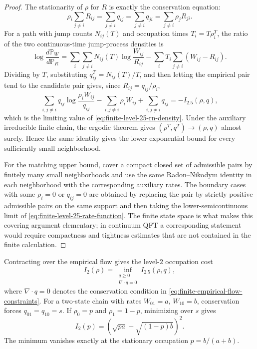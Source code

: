 \begin{proof}
The stationarity of \(\rho\) for \(R\) is exactly the conservation equation:
\[
  \rho_i\sum_{j\ne i}R_{ij}
  =
  \sum_{j\ne i}q_{ij}
  =
  \sum_{j\ne i}q_{ji}
  =
  \sum_{j\ne i}\rho_jR_{ji}.
\]
For a path with jump counts \(N_{ij}(T)\) and occupation times
\(T_i=T\rho_i^T\), the ratio of the two continuous-time jump-process
densities is
\[
  \log\frac{d\mathbb P_W}{d\mathbb P_R}
  =
  \sum_{i}\sum_{j\ne i}
  N_{ij}(T)\log\frac{W_{ij}}{R_{ij}}
  -
  \sum_i T_i
  \sum_{j\ne i}(W_{ij}-R_{ij}).
\]
Dividing by \(T\), substituting \(q^T_{ij}=N_{ij}(T)/T\), and then letting
the empirical pair tend to the candidate pair gives, since
\(R_{ij}=q_{ij}/\rho_i\),
\[
  \sum_{i,j\ne i}
  q_{ij}\log\frac{\rho_iW_{ij}}{q_{ij}}
  -
  \sum_{i,j\ne i}
  \rho_iW_{ij}
  +
  \sum_{i,j\ne i}q_{ij}
  =
  -I_{2.5}(\rho,q),
\]
which is the limiting value of \eqref{eq:finite-level-25-rn-density}.
Under the auxiliary irreducible finite chain, the ergodic theorem gives
\((\rho^T,q^T)\to(\rho,q)\) almost surely.  Hence the same identity gives
the lower exponential bound for every sufficiently small neighborhood.

For the matching upper bound, cover a compact closed set of admissible
pairs by finitely many small neighborhoods and use the same
Radon--Nikodym identity in each neighborhood with the corresponding
auxiliary rates.  The boundary cases with some \(\rho_i=0\) or \(q_{ij}=0\)
are obtained by replacing the pair by strictly positive admissible pairs on
the same support and then taking the lower-semicontinuous limit of
\eqref{eq:finite-level-25-rate-function}.  The finite state space is what
makes this covering argument elementary; in continuum QFT a corresponding
statement would require compactness and tightness estimates that are not
contained in the finite calculation.
\end{proof}

Contracting over the empirical flow gives the level-\(2\) occupation cost
\begin{equation}
  I_2(\rho)
  =
  \inf_{\substack{q\ge0\\ \nabla\cdot q=0}}
  I_{2.5}(\rho,q),
  \label{eq:finite-level-2-contraction}
\end{equation}
where \(\nabla\cdot q=0\) denotes the conservation condition in
\eqref{eq:finite-empirical-flow-constraints}.  For a two-state chain with
rates \(W_{01}=a\), \(W_{10}=b\), conservation forces
\(q_{01}=q_{10}=s\).  If \(\rho_0=p\) and \(\rho_1=1-p\), minimizing over
\(s\) gives
\begin{equation}
  I_2(p)
  =
  \left(\sqrt{pa}-\sqrt{(1-p)b}\right)^2 .
  \label{eq:two-state-level-2-cost}
\end{equation}
The minimum vanishes exactly at the stationary occupation
\(p=b/(a+b)\).

